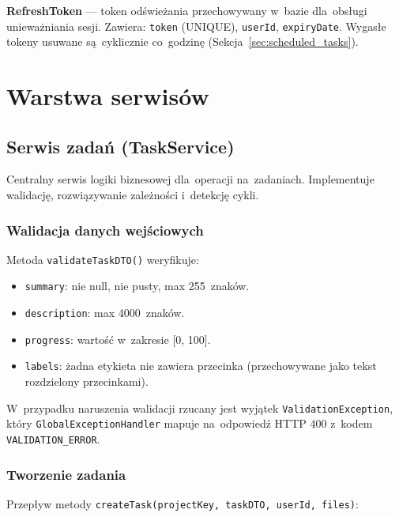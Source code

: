 \textbf{RefreshToken} --- token odświeżania przechowywany w~bazie dla~obsługi unieważniania sesji. Zawiera: \texttt{token} (UNIQUE), \texttt{userId}, \texttt{expiryDate}. Wygasłe tokeny usuwane są~cyklicznie co~godzinę (Sekcja~\ref{sec:scheduled_tasks}).

\section{Warstwa serwisów}

\subsection{Serwis zadań (TaskService)}

Centralny serwis logiki biznesowej dla~operacji na~zadaniach. Implementuje walidację, rozwiązywanie zależności i~detekcję cykli.

\subsubsection{Walidacja danych wejściowych}

Metoda \texttt{validateTaskDTO()} weryfikuje:

\begin{itemize}
    \item \texttt{summary}: nie null, nie pusty, max 255~znaków.
    \item \texttt{description}: max 4000~znaków.
    \item \texttt{progress}: wartość w~zakresie [0, 100].
    \item \texttt{labels}: żadna etykieta nie zawiera przecinka (przechowywane jako tekst rozdzielony przecinkami).
\end{itemize}

W~przypadku naruszenia walidacji rzucany jest wyjątek \texttt{ValidationException}, który \texttt{GlobalExceptionHandler} mapuje na~odpowiedź HTTP 400 z~kodem \texttt{VALIDATION\_ERROR}.

\subsubsection{Tworzenie zadania}

Przepływ metody \texttt{createTask(projectKey, taskDTO, userId, files)}:


